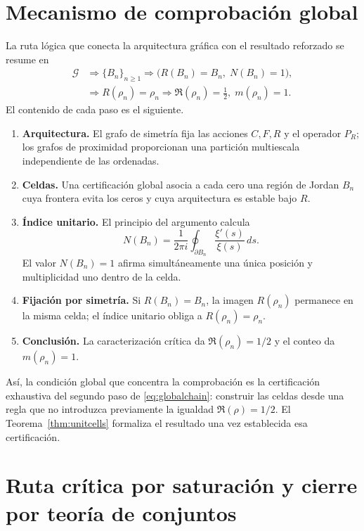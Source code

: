 \documentclass[11pt]{amsart}
\theoremstyle{definition}
\theoremstyle{remark}
\begin{document}
\section{Mecanismo de comprobación global}\label{sec:globalmechanism}
La ruta lógica que conecta la arquitectura gráfica con el resultado reforzado se resume en
\begin{equation}\label{eq:globalchain}
\boxed{\begin{aligned}
\mathcal G &\Longrightarrow \{B_n\}_{n\ge1}
\Longrightarrow \bigl(R(B_n)=B_n,\;N(B_n)=1\bigr),\\
&\Longrightarrow R(\rho_n)=\rho_n
\Longrightarrow \Re(\rho_n)=\frac12,\;m(\rho_n)=1.
\end{aligned}}
\end{equation}
El contenido de cada paso es el siguiente.
\begin{enumerate}[label=\textbf{G\arabic*.},leftmargin=*]
\item \textbf{Arquitectura.} El grafo de simetría fija las acciones $C,F,R$ y el operador $P_R$; los grafos de proximidad proporcionan una partición multiescala independiente de las ordenadas.
\item \textbf{Celdas.} Una certificación global asocia a cada cero una región de Jordan $B_n$ cuya frontera evita los ceros y cuya arquitectura es estable bajo $R$.
\item \textbf{Índice unitario.} El principio del argumento calcula
\[
N(B_n)=\frac{1}{2\pi i}\oint_{\partial B_n}\frac{\xi'(s)}{\xi(s)}\,ds.
\]
El valor $N(B_n)=1$ afirma simultáneamente una única posición y multiplicidad uno dentro de la celda.
\item \textbf{Fijación por simetría.} Si $R(B_n)=B_n$, la imagen $R(\rho_n)$ permanece en la misma celda; el índice unitario obliga a $R(\rho_n)=\rho_n$.
\item \textbf{Conclusión.} La caracterización crítica da $\Re(\rho_n)=1/2$ y el conteo da $m(\rho_n)=1$.
\end{enumerate}
Así, la condición global que concentra la comprobación es la certificación exhaustiva del segundo paso de \eqref{eq:globalchain}: construir las celdas desde una regla que no introduzca previamente la igualdad $\Re(\rho)=1/2$. El Teorema~\ref{thm:unitcells} formaliza el resultado una vez establecida esa certificación.

\section{Ruta crítica por saturación y cierre por teoría de conjuntos}\label{sec:saturation}
\end{document}
